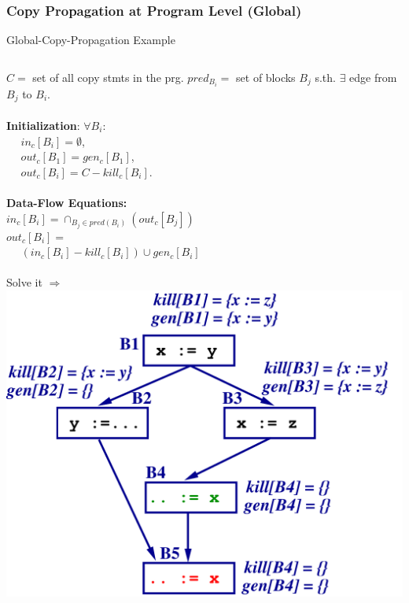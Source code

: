 \documentclass{beamer}
\renewcommand{\emph}[1]{\textcolor{structure}{#1}}
\newcommand{\emp}[1]{\textcolor{DikuRed}{ #1}}
\begin{document}
\begin{frame}[fragile,t]
    \frametitle{Copy Propagation at Program Level (Global)}


\begin{block}{Global-Copy-Propagation Example}
\begin{columns}
$C =$ set of all copy stmts in the prg.
\emph{$pred_{B_i} = $} set of blocks $B_j$
s.th. $\exists$ edge from $B_j$ to $B_i$.\\
$\mbox{~~}$\\
\emph{\bf Initialization}: $\forall B_i$:\\
$\mbox{~~~~}in_c[B_i] = \emptyset$,\\
$\mbox{~~~~}out_c[B_1] = gen_c[B_1]$,\\
$\mbox{~~~~}out_c[B_i] = C - kill_c[B_i]$.\\
$\mbox{~~}$\\
\emph{\bf Data-Flow Equations:}\\
$in_c[B_i] = \cap_{B_j\in pred(B_i)}(out_c[B_j])$\\
$out_c[B_i] =$\\
$\mbox{~~~~}(in_c[B_i] - kill_c[B_i]) \cup gen_c[B_i]$\\
$\mbox{~~}$\\
\emp{Solve it $\Rightarrow$}
\hspace{-13ex}\includegraphics[width=44ex]{Figures/CopyProp}
\end{columns}
\end{block}

\end{frame}
\end{document}
